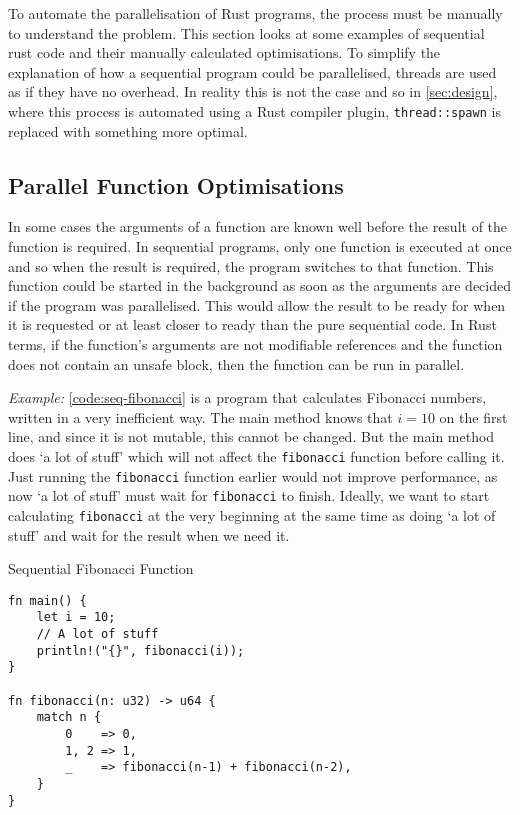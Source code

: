 \documentclass[conference]{IEEEtran}
\begin{document}
To automate the parallelisation of Rust programs, the process must be manually to understand the problem. This section looks at some examples of sequential rust code and their manually calculated optimisations. To simplify the explanation of how a sequential program could be parallelised, threads are used as if they have no overhead. In reality this is not the case and so in \autoref{sec:design}, where this process is automated using a Rust compiler plugin, \texttt{thread::spawn} is replaced with something more optimal.

\subsection{Parallel Function Optimisations}
In some cases the arguments of a function are known well before the result of the function is required. In sequential programs, only one function is executed at once and so when the result is required, the program switches to that function. This function could be started in the background as soon as the arguments are decided if the program was parallelised. This would allow the result to be ready for when it is requested or at least closer to ready than the pure sequential code.
In Rust terms, if the function's arguments are not modifiable references and the function does not contain an unsafe block, then the function can be run in parallel.

\textit{Example:}
\autoref{code:seq-fibonacci} is a program that calculates Fibonacci numbers, written in a very inefficient way. The main method knows that $i = 10$ on the first line, and since it is not mutable, this cannot be changed. But the main method does `a lot of stuff' which will not affect the \texttt{fibonacci} function before calling it. Just running the \texttt{fibonacci} function earlier would not improve performance, as now `a lot of stuff' must wait for \texttt{fibonacci} to finish. Ideally, we want to start calculating \texttt{fibonacci} at the very beginning at the same time as doing `a lot of stuff' and wait for the result when we need it.

\begin{algorithm}
\caption{Sequential Fibonacci Function}
\label{code:seq-fibonacci}
\begin{verbatim}
fn main() {
    let i = 10;
    // A lot of stuff
    println!("{}", fibonacci(i));
}

fn fibonacci(n: u32) -> u64 {
    match n {
        0    => 0,
        1, 2 => 1,
        _    => fibonacci(n-1) + fibonacci(n-2),
    }
}
\end{verbatim}
\end{algorithm}
\end{document}
